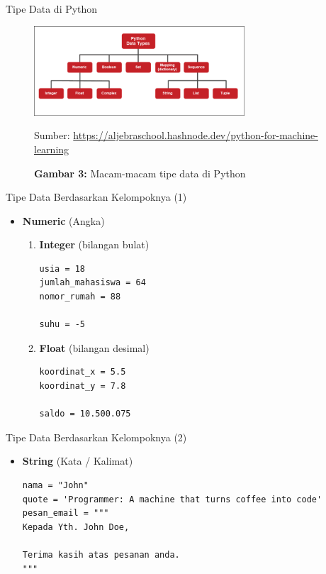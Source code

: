 \documentclass[aspectratio=169, table]{beamer}
\begin{document}
\begin{frame}{Tipe Data di Python}
\begin{figure}[H]
	\centering
	\includegraphics[width=0.7\textwidth]{assets/images/python_data_types.png}
	\caption*{\textbf{Gambar 3:} Macam-macam tipe data di Python}
	\smallskip
    {\tiny Sumber: \url{https://aljebraschool.hashnode.dev/python-for-machine-learning}}
\end{figure}
\end{frame}

\begin{frame}[fragile]{Tipe Data Berdasarkan Kelompoknya (1)}
\begin{itemize}
\item \textbf{Numeric} (Angka)
\begin{enumerate}
\item \textbf{Integer} (bilangan bulat)
\begin{lstlisting}[style=PythonStyle]
usia = 18
jumlah_mahasiswa = 64
nomor_rumah = 88

suhu = -5
\end{lstlisting}
\item \textbf{Float} (bilangan desimal)
\begin{lstlisting}[style=PythonStyle]
koordinat_x = 5.5
koordinat_y = 7.8

saldo = 10.500.075
\end{lstlisting}
\end{enumerate}

\end{itemize}
\end{frame}

\begin{frame}[fragile]{Tipe Data Berdasarkan Kelompoknya (2)}
\begin{itemize}
\item \textbf{String} (Kata / Kalimat)
\begin{lstlisting}[style=PythonStyle]
nama = "John"
quote = 'Programmer: A machine that turns coffee into code'
pesan_email = """
Kepada Yth. John Doe,

Terima kasih atas pesanan anda.
"""
\end{lstlisting}

\end{itemize}
\end{frame}
\end{document}
